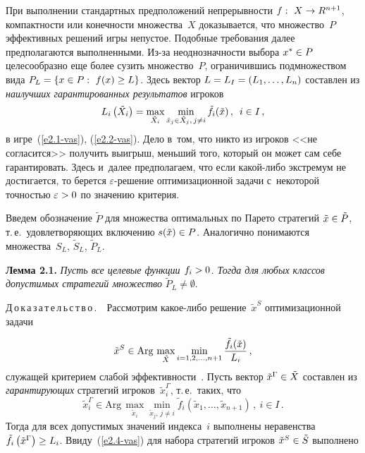 \begin{multicols}{2}
    При выполнении стандартных предположений непрерывности $f:\ X\hm\to
R^{n+1}$, компактности или конечности множества~$X$ доказывается, что
множество~$P$ эффективных решений игры не\-пус\-тое. Подобные требования далее
предполагаются выполненными. Из-за неоднозначности выбора $x^*\hm\in P$
целесообразно еще более сузить множество~$P$, ограничившись подмножеством
вида $P_L\hm= \{ x\in P:\ f(x)\hm\geq L\}$. Здесь вектор $L\hm= L_I \hm= (L_1,\ldots,
L_n)$ составлен из \textit{наилучших гарантированных результатов} игроков
    $$
    L_i\left(\tilde{X}_i\right) =
    \max\limits_{\tilde{X}_i}
    \min\limits_{\tilde{x}_j\in \tilde{X}_j,\, j\not=i} \tilde{f}_i(\tilde{x})\,,\enskip  i\in
I\,,
    $$
в игре~(\ref{e2.1-vas}), (\ref{e2.2-vas}). Дело в~том, что никто из игроков <<не
согласится>> получить выигрыш, меньший того, который он может сам себе
гарантировать. Здесь и~далее предполагаем, что если ка\-кой-ли\-бо экстремум не
достигается, то берется $\varepsilon$-ре\-ше\-ние оптимизационной задачи с~некоторой точностью $\varepsilon\hm >0$ по значению критерия.

    Введем обозначение $\tilde{P}$ для множества оптимальных по Парето
стратегий $\tilde{x}\hm\in \tilde{P}$, т.\,е.\ удовлетво\-ря\-ющих включению
$s(\tilde{x})\hm\in P$. Аналогично понимаются множества~$S_L$, $\tilde{S}_L$,
$\tilde{P}_L$.

    \smallskip

    \noindent
    \textbf{Лемма 2.1.} \textit{Пусть все целевые функции $f_i\hm >0$. Тогда для
любых классов допустимых стратегий множество} $\tilde{P}_L\not= \emptyset$.

    \smallskip

    \noindent
    Д\,о\,к\,а\,з\,а\,т\,е\,л\,ь\,с\,т\,в\,о\,.\ \  Рассмотрим какое-либо
решение~$\tilde{x}^S$ оптимизационной задачи

\noindent
    \begin{equation}
    \tilde{x}^S\in \mathrm{Arg}\,\max\limits_{\tilde{X}}
    \min\limits_{i=1,2,\ldots, n+1} \displaystyle\frac{\displaystyle \tilde{f}_i(\tilde{x})\mathstrut}{\displaystyle L_i\mathstrut}\,,
    \label{e2.4-vas}
    \end{equation}
служащей критерием слабой эффективности~\cite{17-vas}. Пусть вектор
$\tilde{x}^\Gamma \hm\in \tilde{X}$ составлен из \textit{гарантирующих} стратегий
игроков~$\tilde{x}_i^\Gamma$, т.\,е.\ таких, что
$$
\tilde{x}^\Gamma_i \in \mathrm{Arg}\,\max\limits_{\tilde{x}_i}
\min\limits_{\tilde{x}_j,\,j\not=i} \tilde{f}_i \left( \tilde{x}_1, \ldots ,
\tilde{x}_{n+1}\right)\,,\ i\in I\,.
$$
Тогда для всех допустимых значений индекса~$i$ выполнены неравенства
$\tilde{f}_i \left( \tilde{x}^\Gamma\right) \hm\geq L_i$. Ввиду~(\ref{e2.4-vas}) для
набора стратегий игроков $\tilde{x}^S\hm\in \tilde{S}$ выполнено


\end{multicols}
